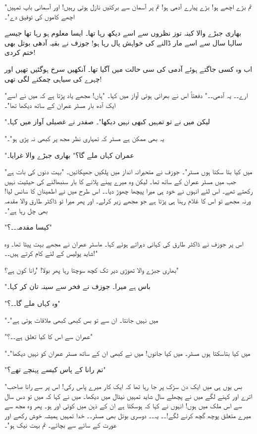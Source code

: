 "تم بڑے اچھے ہو! بڑے پیارے آدمی ہو! تم پر آسمان سے برکتیں نازل ہوتی رہیں! اور آسمانی باپ تمہیں اچھے کاموں کی توفیق دے"۔

بھاری جبڑے والا کینہ توز نظروں سے اسے دیکھ رہا تھا۔ ایسا معلوم ہو رہا تھا جیسے سالہا سال سے اسے مار ڈالنے کی خواہش پال رہا ہو! جوزف نے بقیہ آدھی بوتل بھی ختم کردی!

اب وہ کسی جاگتے ہوئے آدمی کی سی حالت میں آگیا تھا۔ آنکھیں سرخ ہوگئیں تھیں اور چہرے کی سیاہی چمکنے لگی تھی!

"ارے۔۔ یہ آدمی۔۔" دفعتاً اس نے بھرائی ہوئی آواز میں کہا۔ "ہاں! مجھے یاد پڑتا ہے کہ میں نے اسے ایک آدھ بار مسٹر عمران کے ساتھ دیکھا تھا"۔

"لیکن میں نے تو تمہیں کبھی نہیں دیکھا"۔ صفدر نے غصیلی آواز میں کہا۔

"یہ بھی ممکن ہے مسٹر کہ تمہاری نظر مجھ پر کبھی نہ پڑی ہو"۔

"عمران کہاں ملے گا؟" بھاری جبڑے والا غرایا۔

"میں کیا بتا سکتا ہوں مسٹر"۔ جوزف نے متحیرانہ انداز میں پلکیں جھپکائیں۔ "بہت دنوں کی بات ہے جب میں مسٹر عمران کے ساتھ تھا۔ لیکن وہ میرے پینے پلانے کا بار سنبھالنے کی حیثیت نہیں رکھتے تھے۔ اس لئے انہوں نے خود ہی میرا پیچھا چھوڑ دیا۔۔ اس طرح میں نے اطمینان کا سانس لیا! ورنہ مجھے تو اس کا غلام رہنا ہی پڑتا ہے جو مجھے زیر کرلے۔ اور پھر میرا تو ڈاکٹر طارق والا مقدمہ بھی چل رہا ہے"۔

"کیسا مقدمہ۔۔؟"

اس پر جوزف نے ڈاکٹر طارق کی کہانی دہراتے ہوئے کہا۔ ماسٹر عمران نے مجھے بہت پیٹا تھا۔ وہ شاید پولیس کے لئے کام کرتے ہیں۔۔!"

بھاری جبڑے والا تھوڑی دیر تک کچھ سوچتا رہا پھر بولا! "رانا کون ہے؟"

"باس ہے میرا۔ جوزف نے فخر سے سینہ تان کر کہا۔

"وہ کہاں ملے گا۔۔؟"

"میں نہیں جانتا۔ ان سے تو بس کبھی کبھی ملاقات ہوتی ہے"۔

"عمران سے اس کا کیا تعلق ہے۔۔؟"

"میں کیا بتاسکتا ہوں مسٹر۔ میں کیا جانوں! میں نے کبھی ان کے ساتھ مسٹر عمران کو نہیں دیکھا"۔

"تم رانا کے پاس کیسے پہنچے تھے؟"

"بس یوں ہی میں ایک دن سڑک پر جا رہا تھا کہ ایک کار میرے پاس رکی! اس پر سے رانا صاحب اترے اور کہنے لگے میں نے پچھلے سال شاید تمہیں نیٹال میں دیکھا۔ میں نے کہا کہ میں تو دس سال سے اس ملک میں ہوں! انہوں نے کہا کہ ہوسکتا ہے ان کے ذہن میں کوئی اور ہو۔ پھر وہ مجھ سے میرے متعلق پوچھ گچھ کرنے لگے!۔۔ یہ۔۔ دوسری بوتل بھی مسٹر۔۔ خدا تمہیں ہمیشہ خوش رکھے اور عورت کے سائے سے بچائے۔ تم بہت نیک ہو"۔

